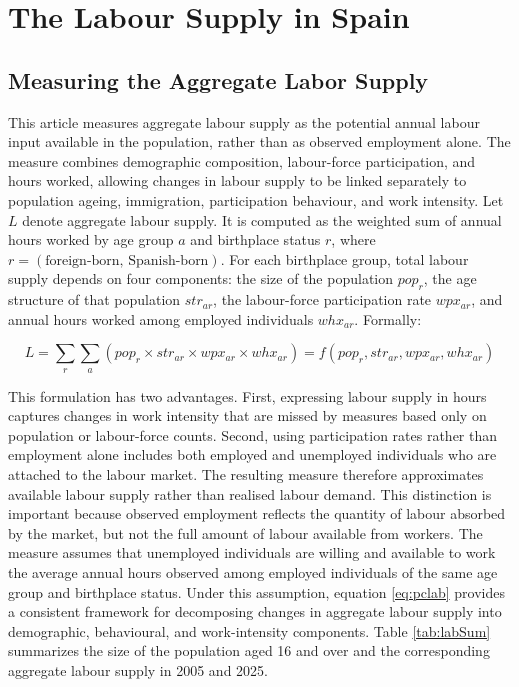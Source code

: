 \section{The Labour Supply in Spain}\label{sec:lab_method}

\subsection{Measuring the Aggregate Labor Supply }

This article measures aggregate labour supply as the potential annual labour input available in the population, rather than as observed employment alone. The measure combines demographic composition, labour-force participation, and hours worked, allowing changes in labour supply to be linked separately to population ageing, immigration, participation behaviour, and work intensity. Let \(L\) denote aggregate labour supply. It is computed as the weighted sum of annual hours worked by age group \(a\) and birthplace status \(r\), where \(r = (\text{foreign-born, Spanish-born})\). For each birthplace group, total labour supply depends on four components: the size of the population \(pop_{r}\), the age structure of that population \(str_{ar}\), the labour-force participation rate \(wpx_{ar}\), and annual hours worked among employed individuals \(whx_{ar}\). Formally:

\begin{equation}\label{eq:pclab}
  L = \displaystyle\sum_{r}\displaystyle\sum_{a}(pop_{r} \times str_{ar} \times wpx_{ar} \times whx_{ar}) = f(pop_{r}, str_{ar}, wpx_{ar}, whx_{ar})
\end{equation}

This formulation has two advantages. First, expressing labour supply in hours captures changes in work intensity that are missed by measures based only on population or labour-force counts. Second, using participation rates rather than employment alone includes both employed and unemployed individuals who are attached to the labour market. The resulting measure therefore approximates available labour supply rather than realised labour demand. This distinction is important because observed employment reflects the quantity of labour absorbed by the market, but not the full amount of labour available from workers. The measure assumes that unemployed individuals are willing and available to work the average annual hours observed among employed individuals of the same age group and birthplace status. Under this assumption, equation \eqref{eq:pclab} provides a consistent framework for decomposing changes in aggregate labour supply into demographic, behavioural, and work-intensity components. Table \ref{tab:labSum} summarizes the size of the population aged 16 and over and the corresponding aggregate labour supply in 2005 and 2025.


